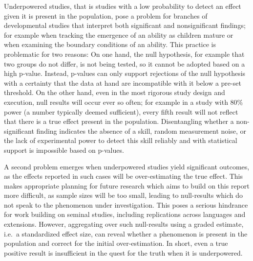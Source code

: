 \documentclass[english,floatsintext,man]{apa6}
\begin{document}
Underpowered studies, that is studies with a low probability to detect
an effect given it is present in the population, pose a problem for
branches of developmental studies that interpret both significant and
nonsignificant findings; for example when tracking the emergence of an
ability as children mature or when examining the boundary conditions of
an ability. This practice is problematic for two reasons: On one hand,
the null hypothesis, for example that two groups do not differ, is not
being tested, so it cannot be adopted based on a high p-value. Instead,
p-values can only support rejections of the null hypothesis with a
certainty that the data at hand are incompatible with it below a pre-set
threshold. On the other hand, even in the most rigorous study design and
execution, null results will occur ever so often; for example in a study
with 80\% power (a number typically deemed sufficient), every fifth
result will not reflect that there is a true effect present in the
population. Disentangling whether a non-significant finding indicates
the absence of a skill, random measurement noise, or the lack of
experimental power to detect this skill reliably and with statistical
support is impossible based on p-values.

A second problem emerges when underpowered studies yield significant
outcomes, as the effects reported in such cases will be over-estimating
the true effect. This makes appropriate planning for future research
which aims to build on this report more difficult, as sample sizes will
be too small, leading to null-results which do not speak to the
phenomenon under investigation. This poses a serious hindrance for work
building on seminal studies, including replications across languages and
extensions. However, aggregating over such null-results using a graded
estimate, i.e.~a standardized effect size, can reveal whether a
phenomenon is present in the population and correct for the initial
over-estimation. In short, even a true positive result is insufficient
in the quest for the truth when it is underpowered.
\end{document}
